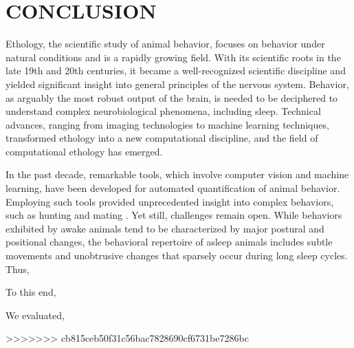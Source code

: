 \setlength{\parindent}{0pt}
\chapter{\bf CONCLUSION}\label{chapter:conclusion}

Ethology, the scientific study of animal behavior, focuses on behavior under natural conditions and is a rapidly growing field.
With its scientific roots in the late 19th and 20th centuries, it became a well-recognized scientific discipline and yielded significant insight into general principles of the nervous system.
Behavior, as arguably the most robust output of the brain, is needed to be deciphered to understand complex neurobiological phenomena, including sleep.
Technical advances, ranging from imaging technologies to machine learning techniques, transformed ethology into a new computational discipline, and the field of computational ethology has emerged.

In the past decade, remarkable tools, which involve computer vision and machine learning, have been developed for automated quantification of animal behavior.
Employing such tools provided unprecedented insight into complex behaviors, such as hunting and mating \citep{mearns_deconstructing_2020, janisch_deciphering_2021}.
Yet still, challenges remain open.
While behaviors exhibited by awake animals tend to be characterized by major postural and positional changes, the behavioral repertoire of asleep animals includes subtle movements and unobtrusive changes that sparsely occur during long sleep cycles.
Thus,

To this end,

We evaluated,

>>>>>>> cb815ceb50f31c56bac7828690cf6731be7286bc




